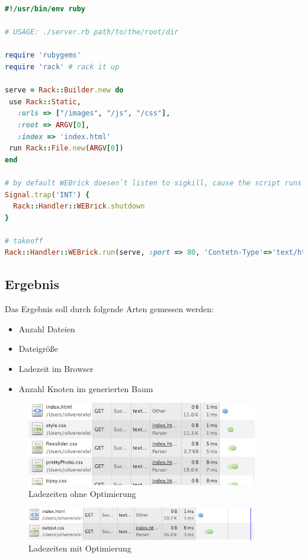 \begin{lstlisting}[label=server_rb,language=Ruby, caption=Ruby Webservice für Messdaten]
#!/usr/bin/env ruby

# USAGE: ./server.rb path/to/the/root/dir

require 'rubygems'
require 'rack' # rack it up

serve = Rack::Builder.new do
 use Rack::Static, 
   :urls => ["/images", "/js", "/css"],
   :root => ARGV[0],
   :index => 'index.html'
 run Rack::File.new(ARGV[0])
end

# by default WEBrick doesen`t listen to sigkill, cause the script runs in a new session. 
Signal.trap('INT') {
  Rack::Handler::WEBrick.shutdown
}

# takeoff
Rack::Handler::WEBrick.run(serve, :port => 80, 'Contetn-Type'=>'text/html')
\end{lstlisting}

\subsection{Ergebnis}
Das Ergebnis soll durch folgende Arten gemessen werden:
\begin{itemize}
    \item{Anzahl Dateien}
    \item{Dateigröße}
    \item{Ladezeit im Browser}
    \item{Anzahl Knoten im generierten Baum}
\end{itemize}

\begin{figure}[ht!]
	\begin{center}
		\includegraphics[width=0.9\textwidth]{img/ladezeiten_chrome_dflt}
		\caption{Ladezeiten ohne Optimierung}
		\label{ladezeiten-dflt}	
	\end{center}
\end{figure}

\begin{figure}[ht!]
	\begin{center}
		\includegraphics[width=0.9\textwidth]{img/ladezeiten_chrome_opted}
		\caption{Ladezeiten mit Optimierung}
		\label{ladezeiten-opted}	
	\end{center}
\end{figure}

